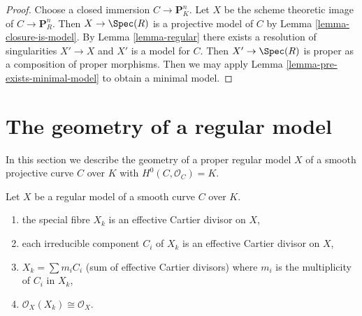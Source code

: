 \begin{proof}
Choose a closed immersion $C \to \mathbf{P}^n_K$. Let
$X$ be the scheme theoretic image of $C \to \mathbf{P}^n_R$.
Then $X \to \Spec(R)$ is a projective model of $C$ by
Lemma \ref{lemma-closure-is-model}.
By Lemma \ref{lemma-regular} there exists a resolution
of singularities $X' \to X$ and $X'$ is a model for $C$.
Then $X' \to \Spec(R)$ is proper as a composition of proper morphisms.
Then we may apply Lemma \ref{lemma-pre-exists-minimal-model}
to obtain a minimal model.
\end{proof}





\section{The geometry of a regular model}
\label{section-special-fibre}

\noindent
In this section we describe the geometry of a proper regular model $X$ of a
smooth projective curve $C$ over $K$ with $H^0(C, \mathcal{O}_C) = K$.

\begin{lemma}
\label{lemma-divisor-special-fiber}
Let $X$ be a regular model of a smooth curve $C$ over $K$.
\begin{enumerate}
\item the special fibre $X_k$ is an effective Cartier divisor on $X$,
\item each irreducible component $C_i$ of $X_k$ is an effective
Cartier divisor on $X$,
\item $X_k = \sum m_i C_i$ (sum of effective Cartier divisors)
where $m_i$ is the multiplicity of $C_i$ in $X_k$,
\item $\mathcal{O}_X(X_k) \cong \mathcal{O}_X$.
\end{enumerate}
\end{lemma}

